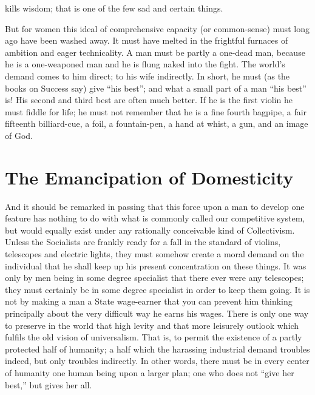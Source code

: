 \documentclass{book}
\begin{document}
kills wisdom; that is one of the few sad and certain things.

But for women this ideal of comprehensive capacity (or common-sense) must long ago have been washed away. It must have melted in the frightful furnaces of ambition and eager technicality. A man must be partly a one-dead man, because he is a one-weaponed man and he is flung naked into the fight. The world’s demand comes to him direct; to his wife indirectly. In short, he must (as the books on Success say) give “his best”; and what a small part of a man “his best” is! His second and third best are often much better. If he is the first violin he must fiddle for life; he must not remember that he is a fine fourth bagpipe, a fair fifteenth billiard-cue, a foil, a fountain-pen, a hand at whist, a gun, and an image of God.

\chapter{The Emancipation of Domesticity}
\label{chapter-21}
And it should be remarked in passing that this force upon a man to develop one feature has nothing to do with what is commonly called our competitive system, but would equally exist under any rationally conceivable kind of Collectivism. Unless the Socialists are frankly ready for a fall in the standard of violins, telescopes and electric lights, they must somehow create a moral demand on the individual that he shall keep up his present concentration on these things. It was only by men being in some degree specialist that there ever were any telescopes; they must certainly be in some degree specialist in order to keep them going. It is not by making a man a State wage-earner that you can prevent him thinking principally about the very difficult way he earns his wages. There is only one way to preserve in the world that high levity and that more leisurely outlook which fulfils the old vision of universalism. That is, to permit the existence of a partly protected half of humanity; a half which the harassing industrial demand troubles indeed, but only troubles indirectly. In other words, there must be in every center of humanity one human being upon a larger plan; one who does not “give her best,” but gives her all.
\end{document}
